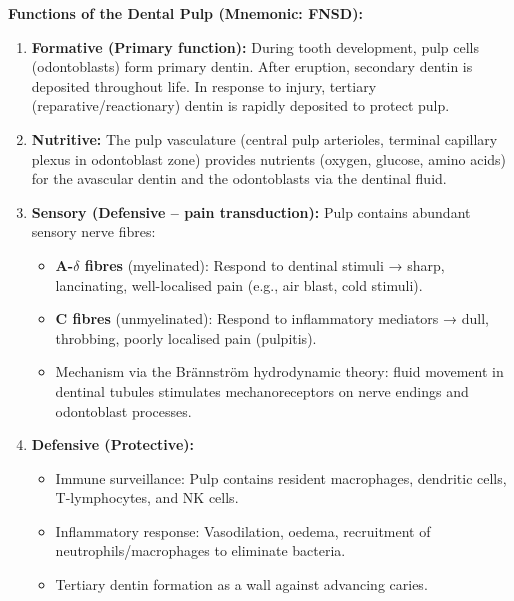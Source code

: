 \documentclass[11pt,a4paper]{article}
\begin{document}
\begin{ansbox}
\textbf{Functions of the Dental Pulp (Mnemonic: FNSD):}

\begin{enumerate}[leftmargin=*]
    \item \textbf{Formative (Primary function):} During tooth development, pulp cells (odontoblasts) form primary dentin. After eruption, secondary dentin is deposited throughout life. In response to injury, tertiary (reparative/reactionary) dentin is rapidly deposited to protect pulp.
    \item \textbf{Nutritive:} The pulp vasculature (central pulp arterioles, terminal capillary plexus in odontoblast zone) provides nutrients (oxygen, glucose, amino acids) for the avascular dentin and the odontoblasts via the dentinal fluid.
    \item \textbf{Sensory (Defensive -- pain transduction):} Pulp contains abundant sensory nerve fibres:
    \begin{itemize}
        \item \textbf{A-$\delta$ fibres} (myelinated): Respond to dentinal stimuli → sharp, lancinating, well-localised pain (e.g., air blast, cold stimuli).
        \item \textbf{C fibres} (unmyelinated): Respond to inflammatory mediators → dull, throbbing, poorly localised pain (pulpitis).
        \item Mechanism via the Brännström hydrodynamic theory: fluid movement in dentinal tubules stimulates mechanoreceptors on nerve endings and odontoblast processes.
    \end{itemize}
    \item \textbf{Defensive (Protective):}
    \begin{itemize}
        \item Immune surveillance: Pulp contains resident macrophages, dendritic cells, T-lymphocytes, and NK cells.
        \item Inflammatory response: Vasodilation, oedema, recruitment of neutrophils/macrophages to eliminate bacteria.
        \item Tertiary dentin formation as a wall against advancing caries.
    \end{itemize}
\end{enumerate}


\end{ansbox}
\end{document}
